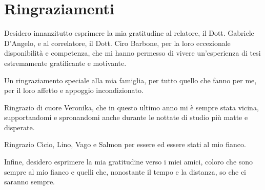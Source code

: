 \chapter{Ringraziamenti}
Desidero innanzitutto  esprimere la mia gratitudine al  relatore, il Dott. Gabriele D'Angelo, e al correlatore, il Dott. Ciro Barbone, per la loro eccezionale disponibilità e competenza, che mi hanno permesso di vivere un'esperienza di tesi estremamente gratificante e motivante.
 
Un ringraziamento speciale alla mia famiglia, per tutto quello che fanno per me, per il loro affetto  e appoggio incondizionato.
 
 Ringrazio di cuore Veronika, che in questo ultimo anno mi è sempre stata  vicina, supportandomi  e spronandomi anche durante le nottate di studio più matte e disperate.

 Ringrazio Cicio, Lino, Vago e Salmon per essere ed essere stati al mio fianco.
 
 Infine, desidero esprimere la mia gratitudine verso i miei amici, coloro che sono sempre  al mio fianco e quelli che, nonostante il tempo e la distanza, so che ci saranno sempre.
 